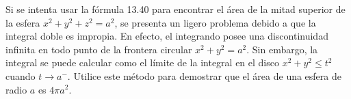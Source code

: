 \item Si se intenta usar la fórmula 13.40 para encontrar el área de la mitad superior de la esfera $x^2 + y^2 + z^2 = a^2$, se presenta un ligero problema debido a que la integral doble es impropia. En efecto, el integrando posee una discontinuidad infinita en todo punto de la frontera circular $x^2 + y^2 = a^2$. Sin embargo, la integral se puede calcular como el límite de la integral en el disco $x^2 + y^2 \le t^2$ cuando $t \to a^-$. Utilice este método para demostrar que el área de una esfera de radio $a$ es $4\pi a^2$.
